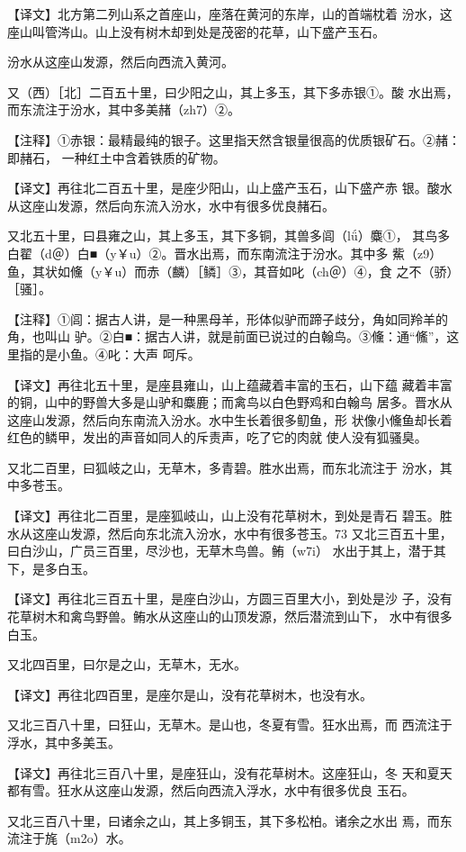 \documentclass[a4paper,12pt,UTF8,twoside]{ctexbook}
\begin{document}
【译文】北方第二列山系之首座山，座落在黄河的东岸，山的首端枕着 汾水，这座山叫管涔山。山上没有树木却到处是茂密的花草，山下盛产玉石。

汾水从这座山发源，然后向西流入黄河。

又（西）［北］二百五十里，曰少阳之山，其上多玉，其下多赤银①。酸 水出焉，而东流注于汾水，其中多美赭（zh7）②。

【注释】①赤银：最精最纯的银子。这里指天然含银量很高的优质银矿石。②赭：即赭石， 一种红土中含着铁质的矿物。

【译文】再往北二百五十里，是座少阳山，山上盛产玉石，山下盛产赤 银。酸水从这座山发源，然后向东流入汾水，水中有很多优良赭石。

又北五十里，曰县雍之山，其上多玉，其下多铜，其兽多闾（lǘ）麋①， 其鸟多白翟（d＠）白■（y￥u）②。晋水出焉，而东南流注于汾水。其中多 鮆（z9）鱼，其状如儵（y￥u）而赤（麟）［鳞］③，其音如叱（ch＠）④，食 之不（骄）［骚］。

【注释】①闾：据古人讲，是一种黑母羊，形体似驴而蹄子歧分，角如同羚羊的角，也叫山 驴。②白■：据古人讲，就是前面已说过的白翰鸟。③儵：通“鯈”，这里指的是小鱼。④叱：大声 呵斥。

【译文】再往北五十里，是座县雍山，山上蕴藏着丰富的玉石，山下蕴 藏着丰富的铜，山中的野兽大多是山驴和麋鹿；而禽鸟以白色野鸡和白翰鸟 居多。晋水从这座山发源，然后向东南流入汾水。水中生长着很多鱽鱼，形 状像小儵鱼却长着红色的鳞甲，发出的声音如同人的斥责声，吃了它的肉就 使人没有狐骚臭。

又北二百里，曰狐岐之山，无草木，多青碧。胜水出焉，而东北流注于 汾水，其中多苍玉。

【译文】再往北二百里，是座狐岐山，山上没有花草树木，到处是青石 碧玉。胜水从这座山发源，然后向东北流入汾水，水中有很多苍玉。73 又北三百五十里，曰白沙山，广员三百里，尽沙也，无草木鸟兽。鲔（w7i） 水出于其上，潜于其下，是多白玉。

【译文】再往北三百五十里，是座白沙山，方圆三百里大小，到处是沙 子，没有花草树木和禽鸟野兽。鲔水从这座山的山顶发源，然后潜流到山下， 水中有很多白玉。

又北四百里，曰尔是之山，无草木，无水。

【译文】再往北四百里，是座尔是山，没有花草树木，也没有水。

又北三百八十里，曰狂山，无草木。是山也，冬夏有雪。狂水出焉，而 西流注于浮水，其中多美玉。

【译文】再往北三百八十里，是座狂山，没有花草树木。这座狂山，冬 天和夏天都有雪。狂水从这座山发源，然后向西流入浮水，水中有很多优良 玉石。

又北三百八十里，曰诸余之山，其上多铜玉，其下多松柏。诸余之水出 焉，而东流注于旄（m2o）水。
\end{document}
